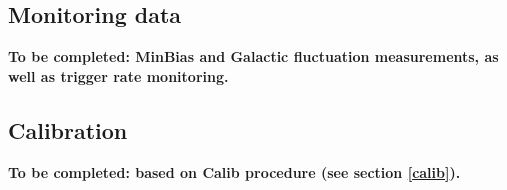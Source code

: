 \subsection{Monitoring data}
{\bf To be completed: MinBias and Galactic fluctuation measurements, as well as trigger rate monitoring.}

\subsection{Calibration}
{\bf To be completed: based on Calib procedure (see section \ref{calib}).}
